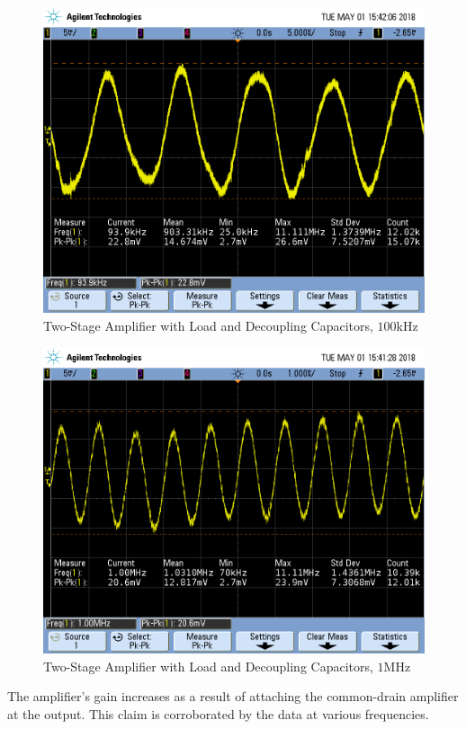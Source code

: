 \FloatBarrier

\FloatBarrier

\begin{figure}[h!]
	\centering
	\includegraphics[scale=0.45]{./images/SCOPE_17.PNG}
	\caption{Two-Stage Amplifier with Load and Decoupling Capacitors, $100$\si{\kilo\hertz}}
	\label{fig:SCOPE_17}
\end{figure}

\FloatBarrier

\FloatBarrier

\begin{figure}[h!]
	\centering
	\includegraphics[scale=0.45]{./images/SCOPE_16.PNG}
	\caption{Two-Stage Amplifier with Load and Decoupling Capacitors, $1$\si{\mega\hertz}}
	\label{fig:SCOPE_16}
\end{figure}

\FloatBarrier

The amplifier's gain increases as a result of attaching the common-drain amplifier at the output.
This claim is corroborated by the data at various frequencies.
